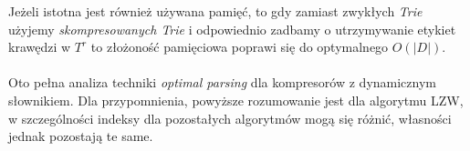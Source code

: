 \documentclass[12pt]{article}
\theoremstyle{plain}
\begin{document}
Jeżeli istotna jest również używana pamięć, to gdy zamiast zwykłych \textit{Trie} użyjemy \textit{skompresowanych Trie} i odpowiednio zadbamy o utrzymywanie etykiet krawędzi w $T^{r}$ to złożoność pamięciowa poprawi się do optymalnego $O(|D|)$.\\
\\
Oto pełna analiza techniki \textit{optimal parsing} dla kompresorów z dynamicznym słownikiem. Dla przypomnienia, powyższe rozumowanie jest dla algorytmu LZW, w szczególności indeksy dla pozostałych algorytmów mogą się różnić, własności jednak pozostają te same.
\newpage
\printbibliography[title={Bibliografia}]
\end{document}
